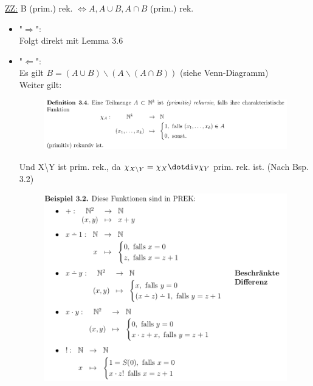 \documentclass[a4paper]{scrartcl}%
\begin{document}
    \underline{ZZ:} B (prim.) rek. $\Leftrightarrow A, A \cup B, A \cap B$ (prim.) rek.\\
    \begin{itemize}
        \item "$\Rightarrow$":\\
            Folgt direkt mit Lemma 3.6\\
        \item "$\Leftarrow$":\\
            Es gilt $B = (A \cup B) \backslash (A \backslash (A \cap B))$ (siehe Venn-Diagramm)\\
            Weiter gilt:\\
            \begin{figure}[H]
                \centering
                \includegraphics[scale=0.3]{./char-fkt.png}
                \label{fig:./char-fkt}
            \end{figure}
            Und X\textbackslash Y ist prim. rek., da $\chi_{X\backslash Y} = \chi_X \dotdiv \chi_Y$ prim. rek. ist. (Nach Bsp. 3.2)\\
            \begin{figure}[H]
                \centering
                \includegraphics[scale=0.3]{./dotdiv.png}
                \label{fig:./dotdiv}
            \end{figure}
             

    \end{itemize}
    



\end{document}
